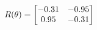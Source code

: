 \documentclass[preview]{standalone}
\begin{document}
\begin{align*}
\special{dvisvgm:raw <g id='unique000'>}R(\theta) = \begin{bmatrix}-0.31 & -0.95\\0.95 & -0.31\end{bmatrix}\special{dvisvgm:raw </g>}
\end{align*}
\end{document}

